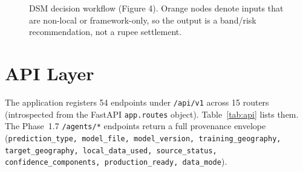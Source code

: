\documentclass[11pt,a4paper]{article}
\newcommand{\code}[1]{\texttt{\small #1}}
\begin{document}
\begin{figure}[H]
\centering
{}
\caption{DSM decision workflow (Figure 4). Orange nodes denote inputs that are
non-local or framework-only, so the output is a band/risk recommendation, not a rupee
settlement.}
\label{fig:dsm}
\end{figure}

\section{API Layer}
The application registers 54 endpoints under \code{/api/v1} across 15 routers (introspected
from the FastAPI \code{app.routes} object). Table~\ref{tab:api} lists them. The Phase~1.7
\code{/agents/*} endpoints return a full provenance envelope
(\code{prediction\_type, model\_file, model\_version, training\_geography,
target\_geography, local\_data\_used, source\_status, confidence\_components,
production\_ready, data\_mode}).
\end{document}
